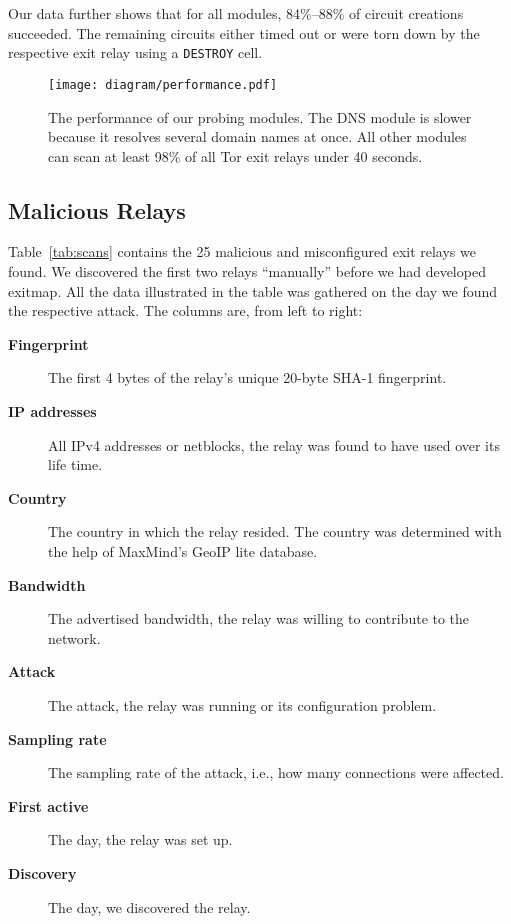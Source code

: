 \documentclass[letterpaper,twocolumn,10pt]{article}
\begin{document}
Our data further shows that for all modules, 84\%--88\% of circuit creations succeeded.  The
remaining circuits either timed out or were torn down by the respective exit relay using a
\texttt{DESTROY} cell.

\begin{figure}[t]
	\centering
	\texttt{[image: diagram/performance.pdf]}
	\caption{The performance of our probing modules.  The DNS module is slower because it resolves
		several domain names at once.  All other modules can scan at least 98\% of all Tor exit
		relays under 40 seconds.}
	\label{fig:performance}
\end{figure}

\subsection{Malicious Relays}
Table~\ref{tab:scans} contains the 25 malicious and misconfigured exit relays we found.  We
discovered the first two relays ``manually'' before we had developed \textsf{exitmap}.  All the data
illustrated in the table was gathered on the day we found the respective attack.  The columns are,
from left to right:
\begin{description}
	\item[\textbf{Fingerprint}] The first 4 bytes of the relay's unique 20-byte SHA-1 fingerprint.
	\item[\textbf{IP addresses}] All IPv4 addresses or netblocks, the relay was found to have used
		over its life time.
	\item[\textbf{Country}] The country in which the relay resided.  The country was
		determined with the help of MaxMind's GeoIP lite database.
	\item[\textbf{Bandwidth}] The advertised bandwidth, the relay was willing to contribute to the
		network.
	\item[\textbf{Attack}] The attack, the relay was running or its configuration problem.
	\item[\textbf{Sampling rate}] The sampling rate of the attack, i.e., how many connections were
		affected.
	\item[\textbf{First active}] The day, the relay was set up.
	\item[\textbf{Discovery}] The day, we discovered the relay.
\end{description}
\end{document}
